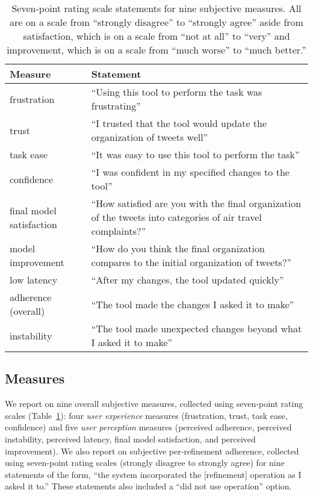 \begin{table}[t!]
    \caption{Seven-point rating scale statements for nine subjective measures. All are on a scale from ``strongly disagree'' to ``strongly agree'' aside from satisfaction, which is on a scale from ``not at all'' to ``very'' and improvement, which is on a scale from ``much worse'' to ``much better.''}
    \scriptsize
    \begin{center}
       \begin{tabular}{l p{5cm}}
        \toprule
        Measure & Statement \\
        \midrule
        frustration & ``Using this tool to perform the task was frustrating''\\
        trust & ``I trusted that the tool would update the organization of tweets well''\\
        task ease & ``It was easy to use this tool to perform the task''\\
        confidence & ``I was confident in my specified changes to the tool''\\
        final model satisfaction & ``How satisfied are you with the final organization of the tweets into categories of air travel complaints?''\\
        model improvement & ``How do you think the final organization compares to the initial organization of tweets?''\\
        low latency & ``After my changes, the tool updated quickly''\\
        adherence (overall) & ``The tool made the changes I asked it to make''\\
        instability & ``The tool made unexpected changes beyond what I asked it to make''\\
        \bottomrule
    \end{tabular}
    \end{center}
    \label{tab:subjective_measures}
\end{table}

\subsection{Measures}
We report on nine overall subjective measures, collected using seven-point rating scales (Table~\ref{tab:subjective_measures}): four \textit{user experience} measures (frustration, trust, task ease, confidence) and five \textit{user perception} measures (perceived adherence, perceived instability, perceived latency, final model satisfaction, and perceived improvement). We also report on subjective per-refinement adherence, collected using seven-point rating scales (strongly disagree to strongly agree) for nine statements of the form, ``the system incorporated the [refinement] operation as I asked it to.'' These statements also included a ``did not use operation'' option.

